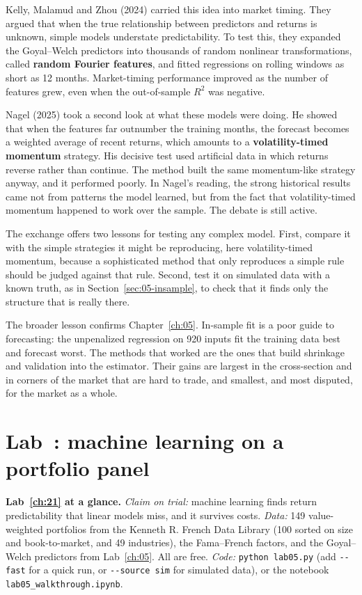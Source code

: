 Kelly, Malamud and Zhou (2024) carried this idea into market timing. They argued that when the true relationship between predictors and returns is unknown, simple models understate predictability. To test this, they expanded the Goyal--Welch predictors into thousands of random nonlinear transformations, called \textbf{random Fourier features}, and fitted regressions on rolling windows as short as 12 months. Market-timing performance improved as the number of features grew, even when the out-of-sample $R^2$ was negative.

Nagel (2025) took a second look at what these models were doing. He showed that when the features far outnumber the training months, the forecast becomes a weighted average of recent returns, which amounts to a \textbf{volatility-timed momentum} strategy. His decisive test used artificial data in which returns reverse rather than continue. The method built the same momentum-like strategy anyway, and it performed poorly. In Nagel's reading, the strong historical results came not from patterns the model learned, but from the fact that volatility-timed momentum happened to work over the sample. The debate is still active.

The exchange offers two lessons for testing any complex model. First, compare it with the simple strategies it might be reproducing, here volatility-timed momentum, because a sophisticated method that only reproduces a simple rule should be judged against that rule. Second, test it on simulated data with a known truth, as in Section~\ref{sec:05-insample}, to check that it finds only the structure that is really there.

The broader lesson confirms Chapter~\ref{ch:05}. In-sample fit is a poor guide to forecasting: the unpenalized regression on 920 inputs fit the training data best and forecast worst. The methods that worked are the ones that build shrinkage and validation into the estimator. Their gains are largest in the cross-section and in corners of the market that are hard to trade, and smallest, and most disputed, for the market as a whole.


\section{Lab~\thechapter: machine learning on a portfolio panel}
\label{sec:21-lab}

\begin{callout}
\textbf{Lab~\ref{ch:21} at a glance.} \emph{Claim on trial:} machine learning finds return predictability that linear models miss, and it survives costs. \emph{Data:} 149 value-weighted portfolios from the Kenneth R. French Data Library (100 sorted on size and book-to-market, and 49 industries), the Fama--French factors, and the Goyal--Welch predictors from Lab~\ref{ch:05}. All are free. \emph{Code:} \texttt{python lab05.py} (add \texttt{-{}-fast} for a quick run, or \texttt{-{}-source sim} for simulated data), or the notebook \texttt{lab05\_walkthrough.ipynb}.
\end{callout}

